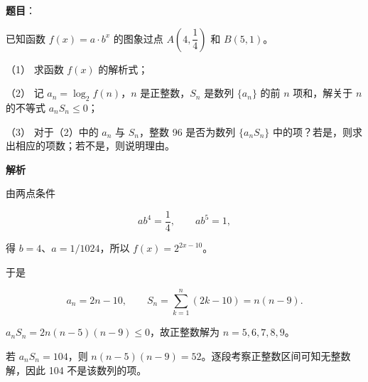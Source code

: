 \begin{answer}

\textbf{题目}：

已知函数 $f(x)=a\cdot b^x$ 的图象过点 $A(4,\dfrac14)$ 和 $B(5,1)$。

（1） 求函数 $f(x)$ 的解析式；

（2） 记 $a_n=\log_2f(n)$，$n$ 是正整数，$S_n$ 是数列 $\{a_n\}$ 的前 $n$ 项和，解关于 $n$ 的不等式 $a_nS_n\le0$；

（3） 对于（2）中的 $a_n$ 与 $S_n$，整数 96 是否为数列 $\{a_nS_n\}$ 中的项？若是，则求出相应的项数；若不是，则说明理由。

\textbf{解析}


由两点条件

\nopagebreak[4]
\[
ab^4=\frac14,\qquad ab^5=1,
\]

得 $b=4$、$a=1/1024$，所以 $f(x)=2^{2x-10}$。


于是

\nopagebreak[4]
\[
a_n=2n-10,\qquad
S_n=\sum_{k=1}^n(2k-10)=n(n-9).
\]

 $a_nS_n=2n(n-5)(n-9)\le0$，故正整数解为 $n=5,6,7,8,9$。


若 $a_nS_n=104$，则 $n(n-5)(n-9)=52$。逐段考察正整数区间可知无整数解，因此 104 不是该数列的项。




\end{answer}
